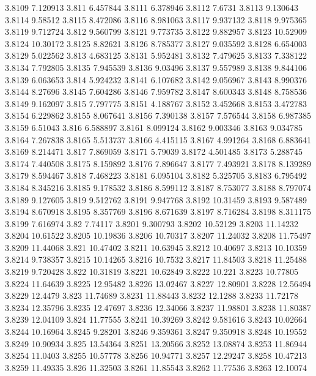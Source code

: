 3.8109  7.120913
3.811  6.457844
3.8111  6.378946
3.8112  7.6731
3.8113  9.130643
3.8114  9.58512
3.8115  8.472086
3.8116  8.981063
3.8117  9.937132
3.8118  9.975365
3.8119  9.712724
3.812  9.560799
3.8121  9.773735
3.8122  9.882957
3.8123  10.52909
3.8124  10.30172
3.8125  8.82621
3.8126  8.785377
3.8127  9.035592
3.8128  6.654003
3.8129  5.022562
3.813  4.683125
3.8131  5.952481
3.8132  7.479625
3.8133  7.338122
3.8134  7.792805
3.8135  7.945539
3.8136  9.03496
3.8137  9.557989
3.8138  9.844106
3.8139  6.063653
3.814  5.924232
3.8141  6.107682
3.8142  9.056967
3.8143  8.990376
3.8144  8.27696
3.8145  7.604286
3.8146  7.959782
3.8147  8.600343
3.8148  8.758536
3.8149  9.162097
3.815  7.797775
3.8151  4.188767
3.8152  3.452668
3.8153  3.472783
3.8154  6.229862
3.8155  8.067641
3.8156  7.390138
3.8157  7.576544
3.8158  6.987385
3.8159  6.51043
3.816  6.588897
3.8161  8.099124
3.8162  9.003346
3.8163  9.034785
3.8164  7.267838
3.8165  5.513737
3.8166  4.415115
3.8167  4.991264
3.8168  6.883641
3.8169  8.214471
3.817  7.869059
3.8171  5.79039
3.8172  4.501485
3.8173  5.288745
3.8174  7.440508
3.8175  8.159892
3.8176  7.896647
3.8177  7.493921
3.8178  8.139289
3.8179  8.594467
3.818  7.468223
3.8181  6.095104
3.8182  5.325705
3.8183  6.795492
3.8184  8.345216
3.8185  9.178532
3.8186  8.599112
3.8187  8.753077
3.8188  8.797074
3.8189  9.127605
3.819  9.512762
3.8191  9.947768
3.8192  10.31459
3.8193  9.587489
3.8194  8.670918
3.8195  8.357769
3.8196  8.671639
3.8197  8.716284
3.8198  8.311175
3.8199  7.616974
3.82  7.74117
3.8201  9.300793
3.8202  10.52129
3.8203  11.14232
3.8204  10.61522
3.8205  10.19836
3.8206  10.70317
3.8207  11.24032
3.8208  11.75497
3.8209  11.44068
3.821  10.47402
3.8211  10.63945
3.8212  10.40697
3.8213  10.10359
3.8214  9.738357
3.8215  10.14265
3.8216  10.7532
3.8217  11.84503
3.8218  11.25488
3.8219  9.720428
3.822  10.31819
3.8221  10.62849
3.8222  10.221
3.8223  10.77805
3.8224  11.64639
3.8225  12.95482
3.8226  13.02467
3.8227  12.80901
3.8228  12.56494
3.8229  12.4479
3.823  11.74689
3.8231  11.88443
3.8232  12.1288
3.8233  11.72178
3.8234  12.35796
3.8235  12.47697
3.8236  12.34066
3.8237  11.98801
3.8238  11.80387
3.8239  12.04109
3.824  11.77555
3.8241  10.39269
3.8242  9.581616
3.8243  10.02664
3.8244  10.16964
3.8245  9.28201
3.8246  9.359361
3.8247  9.350918
3.8248  10.19552
3.8249  10.90934
3.825  13.54364
3.8251  13.20566
3.8252  13.08874
3.8253  11.86944
3.8254  11.0403
3.8255  10.57778
3.8256  10.94771
3.8257  12.29247
3.8258  10.47213
3.8259  11.49335
3.826  11.32503
3.8261  11.85543
3.8262  11.77536
3.8263  12.10074
